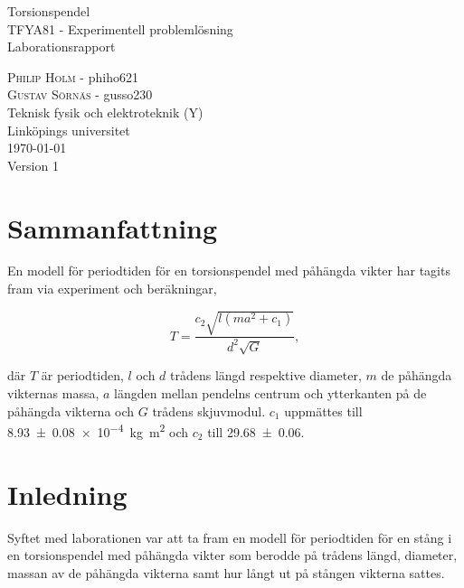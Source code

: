 \documentclass[a4paper,12pt]{article}
\begin{document}
\begin{titlepage}
  \centering
  \vspace{10cm}
  {\Huge Torsionspendel \\}
  \vspace{2cm}
  {\Large TFYA81 - Experimentell problemlösning \\}
  \vspace{0.8em}
  {\Large Laborationsrapport}
  \vfill

  {
    \textsc{Philip Holm} - phiho621 \\
    \textsc{Gustav Sörnäs} - gusso230 \\
    \vspace{2cm}
    Teknisk fysik och elektroteknik (Y) \\
    Linköpings universitet\\\today{}\\Version 1
  }

\end{titlepage}

\section*{Sammanfattning}

En modell för periodtiden för en torsionspendel med påhängda vikter har tagits
fram via experiment och beräkningar,

\begin{equation*}
  T = \frac{c_2 \sqrt{l(ma^2 + c_1)}}{d^2 \sqrt{G}},
\end{equation*}

där $T$ är periodtiden, $l$ och $d$ trådens längd respektive diameter, $m$ de
påhängda vikternas massa, $a$ längden mellan pendelns centrum och ytterkanten på
de påhängda vikterna och $G$ trådens skjuvmodul. $c_1$ uppmättes till
\SI{8.93(8)e-4}{\kilogram \meter \squared} och $c_2$ till
\num{29.68(6)}.

\clearpage

\tableofcontents
\listoffigures
\listoftables
\clearpage


\section{Inledning}

Syftet med laborationen var att ta fram en modell för periodtiden för en stång i
en torsionspendel med påhängda vikter som berodde på trådens längd, diameter,
massan av de påhängda vikterna samt hur långt ut på stången vikterna sattes.
\end{document}
